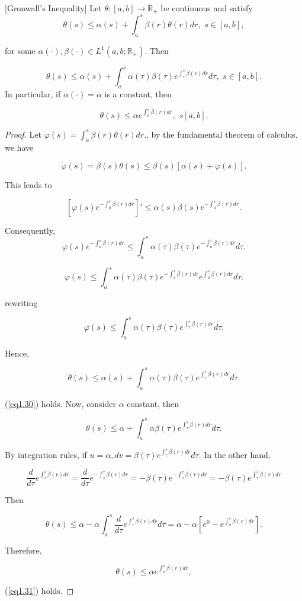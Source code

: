 \begin{prop}\label{GIP}[Gronwall's Inequality]
	Let $\theta:[a,b]\rightarrow \mathbb{R}_{+}$ be continuous and satisfy
	$$\theta (s)\leq \alpha(s)+\int_a^s\beta(r)\theta (r) dr,\,\, s\in [a,b],$$
	
	for some $\alpha(\cdot),\beta (\cdot)\in L^1(a,b;\mathbb{R}_{+})$. Then
	
	\begin{equation}\label{eq1.30}
	\theta(s)\leq \alpha(s)+\int_{a}^{s}\alpha(\tau)\beta(\tau)e^{\int_{\tau}^{s}\beta(r)dr}d\tau,\,\, s\in[a,b].
	\end{equation}
	In particular, if $\alpha(\cdot)=\alpha$ is a constant, then
	
	\begin{equation}\label{eq1.31}
	\theta(s) \leq \alpha e^{\int_{a}^{s}\beta(r)dr},\,\, s[a,b]. 
	\end{equation}
	\end{prop}
\begin{proof}
	Let $\varphi(s)=\int_{a}^{s}\beta(r)\theta(r)dr.$, by the fundamental theorem of calculus, we have
		
	$$\dot{\varphi}(s)=\beta(s)\theta(s)\leq \beta(s)[\alpha(s)+\varphi(s)].$$
	
	This leads to 
	
	$$[\varphi(s)e^{-\int_{a}^{s}\beta(r)dr}]'\leq\alpha(s)\beta(s)e^{-\int_{a}^{s}\beta(r)dr}.$$
	
	Consequently,
	$$\varphi(s)e^{-\int_{a}^{s}\beta(r)dr}\leq \int_{a}^{s}\alpha(\tau)\beta(\tau)e^{-\int_{a}^{\tau}\beta(r)dr}d\tau.$$
	
		$$\varphi(s)\leq \int_{a}^{s}\alpha(\tau)\beta(\tau)e^{-\int_{a}^{\tau}\beta(r)dr}e^{\int_{a}^{s}\beta(r)dr}d\tau .$$
	
	rewriting 
	
	$$\varphi(s)\leq \int_{a}^{s}\alpha(\tau)\beta(\tau)e^{\int_{\tau}^{s}\beta(r)dr}d\tau .$$
	
	Hence,
	
	$$\theta(s)\leq \alpha(s)+\int_{a}^{s}\alpha(\tau)\beta(\tau)e^{\int_{\tau}^{s}\beta(r)dr}d\tau.$$
	
	(\ref{eq1.30}) holds. Now, consider $\alpha$ constant, then
	
	$$\theta(s)\leq \alpha+\int_{a}^{s}\alpha\beta(\tau)e^{\int_{\tau}^{s}\beta(r)dr}d\tau.$$
	
	By integration rules, if $u=\alpha,dv=\beta(\tau)e^{\int_{\tau}^{s}\beta(r)dr}d\tau$. In the other hand,
	
	$$\frac{d}{d\tau}e^{\int_{\tau}^{s}\beta(r)dr}=\frac{d}{d\tau}e^{-\int_{s}^{\tau}\beta(r)dr}=-\beta(\tau) e^{-\int_{s}^{\tau} \beta(r)dr}=-\beta(\tau)e^{\int_{\tau}^{s}\beta(r)dr}$$
	
	Then
	
	$$\theta(s)\leq \alpha-\alpha\int_{a}^{s}\frac{d}{d\tau}e^{\int_{\tau}^{s}\beta(r)dr}d\tau=\alpha-\alpha [e^{0}-e^{\int_{a}^{s}\beta(r)dr}].$$
	
	Therefore,
	
	$$\theta(s)\leq \alpha e^{\int_{a}^{s}\beta(r)dr},$$
	
	(\ref{eq1.31}) holds.
\end{proof}
